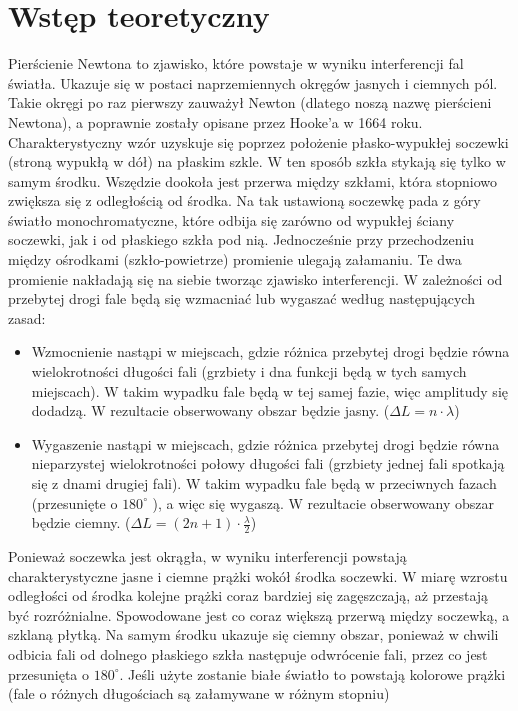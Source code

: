 \documentclass[polish, 11pt, a4paper]{article}
\begin{document}
	\section{Wstęp teoretyczny}
		\RaggedRight
		Pierścienie Newtona to zjawisko, które powstaje w wyniku interferencji fal światła. Ukazuje się w postaci naprzemiennych okręgów jasnych i ciemnych pól. Takie okręgi po raz pierwszy zauważył Newton (dlatego noszą nazwę pierścieni Newtona), a poprawnie zostały opisane przez Hooke’a w 1664 roku. Charakterystyczny wzór uzyskuje się poprzez położenie płasko-wypukłej soczewki (stroną wypukłą w dół) na płaskim szkle. W ten sposób szkła stykają się tylko w samym środku. Wszędzie dookoła jest przerwa między szkłami, która stopniowo zwiększa się z odległością od środka. Na tak ustawioną soczewkę pada z góry światło monochromatyczne, które odbija się zarówno od wypukłej ściany soczewki, jak i od płaskiego szkła pod nią. Jednocześnie przy przechodzeniu między ośrodkami (szkło-powietrze) promienie ulegają załamaniu. Te dwa promienie nakładają się na siebie tworząc zjawisko interferencji. W zależności od przebytej drogi fale będą się wzmacniać lub wygaszać według następujących zasad:\\
		\begin{itemize}
			\item Wzmocnienie nastąpi w miejscach, gdzie różnica przebytej drogi będzie równa wielokrotności długości fali (grzbiety i dna funkcji będą w tych samych miejscach). W takim wypadku fale będą w tej samej fazie, więc amplitudy się dodadzą. W rezultacie obserwowany obszar będzie jasny. (\(\Delta L=n\cdot\lambda\))
			\item Wygaszenie nastąpi w miejscach, gdzie różnica przebytej drogi będzie równa nieparzystej wielokrotności połowy długości fali (grzbiety jednej fali spotkają się z dnami drugiej fali). W takim wypadku fale będą w przeciwnych fazach (przesunięte o \(180^{\circ}\) ), a więc się wygaszą. W rezultacie obserwowany obszar będzie ciemny. (\(\Delta L = (2n+1)\cdot\frac{\lambda}{2}\))
		\end{itemize}
		Ponieważ soczewka jest okrągła, w wyniku interferencji powstają charakterystyczne jasne i ciemne prążki wokół środka soczewki. W miarę wzrostu odległości od środka kolejne prążki coraz bardziej się zagęszczają, aż przestają być rozróżnialne. Spowodowane jest co coraz większą przerwą między soczewką, a szklaną płytką. Na samym środku ukazuje się ciemny obszar, ponieważ w chwili odbicia fali od dolnego płaskiego szkła następuje odwrócenie fali, przez co jest przesunięta o \(180^{\circ}\). Jeśli użyte zostanie białe światło to powstają kolorowe prążki (fale o różnych długościach są załamywane w różnym stopniu)
		
\end{document}
